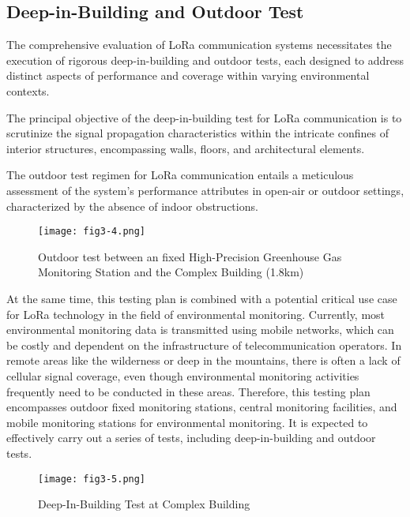 \subsection{Deep-in-Building and Outdoor Test}
The comprehensive evaluation of LoRa communication systems necessitates the execution of rigorous deep-in-building and outdoor tests, each designed to address distinct aspects of performance and coverage within varying environmental contexts.

The principal objective of the deep-in-building test for LoRa communication is to scrutinize the signal propagation characteristics within the intricate confines of interior structures, encompassing walls, floors, and architectural elements.

The outdoor test regimen for LoRa communication entails a meticulous assessment of the system's performance attributes in open-air or outdoor settings, characterized by the absence of indoor obstructions.
\begin{figure}
  \centering
  \texttt{[image: fig3-4.png]}
  \caption{Outdoor test between an fixed High-Precision Greenhouse Gas Monitoring Station and the Complex Building (1.8km)}
  \label{fig:3-4}
\end{figure}
At the same time, this testing plan is combined with a potential critical use case for LoRa technology in the field of environmental monitoring\cite{8515030}. Currently, most environmental monitoring data is transmitted using mobile networks, which can be costly and dependent on the infrastructure of telecommunication operators. In remote areas like the wilderness or deep in the mountains, there is often a lack of cellular signal coverage, even though environmental monitoring activities frequently need to be conducted in these areas. Therefore, this testing plan encompasses outdoor fixed monitoring stations, central monitoring facilities, and mobile monitoring stations for environmental monitoring. It is expected to effectively carry out a series of tests, including deep-in-building and outdoor tests.
\begin{figure}
  \centering
  \texttt{[image: fig3-5.png]}
  \caption{Deep-In-Building Test at Complex Building}
  \label{fig:3-5}
\end{figure}

